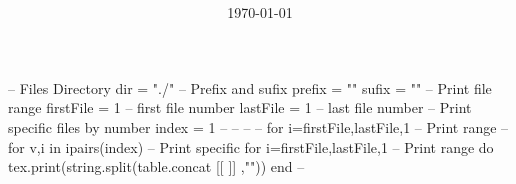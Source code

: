 \documentclass[
    class=article,
    multi={minipage},
    border={3mm},
]{standalone}
\title{\huge\bfseries\color{Emph}\mytitle}
\author{\Large\myauthor}
\date{\Large\today}
\begin{document}
\mymaketitle
\begin{luacode*}
    -- Files Directory
    dir = "./"
    -- Prefix and sufix
    prefix = ""
    sufix  = ""
    -- Print file range
    firstFile = 1 -- first file number
    lastFile  = 1 -- last  file number
    -- Print specific files by number
    index = {1}
    -- %
    -- %
    -- %
    -- for i=firstFile,lastFile,1 -- Print range
    -- for v,i in ipairs(index)   -- Print specific
    for i=firstFile,lastFile,1 -- Print range
    do
        tex.print(string.split(table.concat{
        [[
            \newpage
        ]]
        },"\n"))
    end
    -- %
\end{luacode*}
\end{document}
